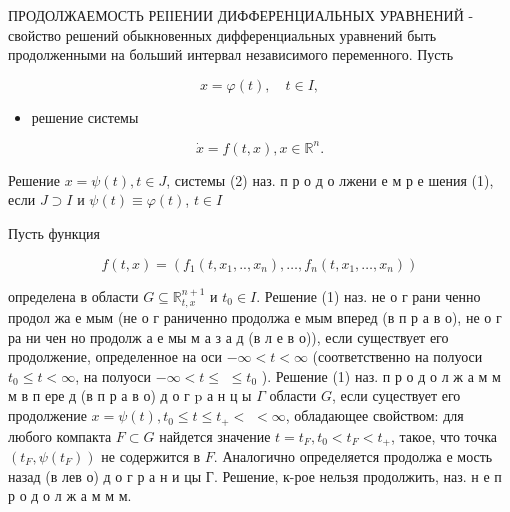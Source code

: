 \documentclass[10pt]{article}
\begin{document}
ПРОДОЛЖАЕМОСТЬ РЕІІЕНИИ ДИФФЕРЕНЦИАЛЬНЫХ УРАВНЕНИЙ - свойство решений обыкновенных дифференциальных уравнений быть продолженными на больший интервал независимого переменного. Пусть



\[

x=\varphi(t), \quad t \in I,

\]



\begin{itemize}

  \item решение системы

\end{itemize}



\[

\dot{x}=f(t, x), x \in \mathbb{R}^{n} .

\]



Решение $x=\psi(t), t \in J$, системы (2) наз. п р о д о лжени е м р е шения (1), если $J \supset I$ и $\psi(t) \equiv \varphi(t)$, $t \in I$



Пусть функция



\[

f(t, x)=\left(f_{1}\left(t, x_{1}, . ., x_{n}\right), \ldots, f_{n}\left(t, x_{1}, \ldots, x_{n}\right)\right)

\]



определена в области $G \subseteq \mathbb{R}_{t, x}^{n+1}$ и $t_{0} \in I$. Решение (1) наз. не о г рани ченно продол жа е мым (не о г раниченно продолжа е мым вперед (в п р а в о), не о г ра ни чен но продолж а е мы м а з а д (в л е в о)), если существует его продолжение, определенное на оси $-\infty<t<\infty$ (соответственно на полуоси $t_{0} \leqslant t<\infty$, на полуоси $-\infty<t \leqslant$ $\leqslant t_{0}$ ). Решение (1) наз. п р о д о л ж а м м м в п ере д (в п р а в о) д о г p а н ц ы $\Gamma$ области $G$, если суцествует его продолжение $x=\psi(t), t_{0} \leqslant t \leqslant t_{+}<$ $<\infty$, обладающее свойством: для любого компакта $F \subset G$ найдется значение $t=t_{F}, t_{0}<t_{F}<t_{+}$, такое, что точка $\left(t_{F}, \psi\left(t_{F}\right)\right)$ не содержится в $F$. Аналогично определяется продолжа е мость назад (в лев о) д о г р а н и цы Г. Решение, к-рое нельзя продолжить, наз. н е п р о д о л ж а м м м.
\end{document}
